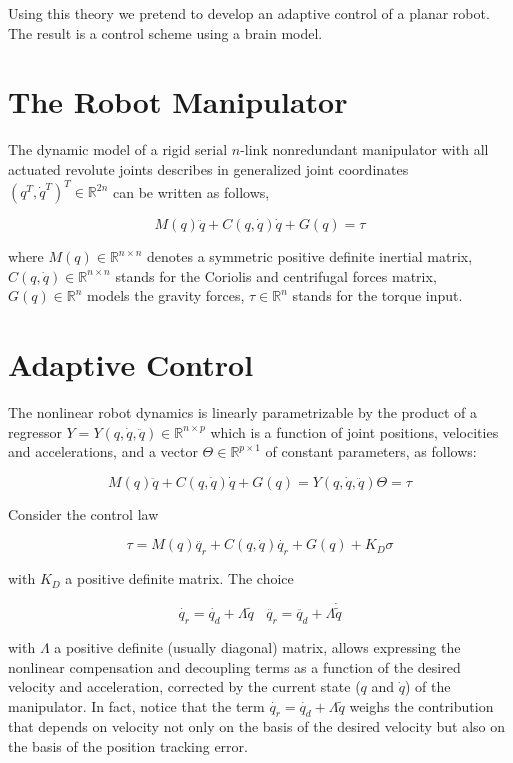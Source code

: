 Using this theory we pretend to develop an adaptive control of a planar robot. The result is a control scheme using a brain model.
\section{The Robot Manipulator}
The dynamic model of a rigid serial $n$-link nonredundant manipulator with all actuated revolute joints describes in generalized joint coordinates $(q^T,\dot{q}^T)^T\in\mathbb{R}^{2n}$ can be written as follows,

\begin{equation}
M(q)\ddot{q}+C(q,\dot{q})\dot{q}+G(q)=\tau\label{din}
\end{equation}

where $M(q)\in\mathbb{R}^{n\times n}$ denotes a symmetric positive definite inertial matrix, $C(q,\dot{q})\in\mathbb{R}^{n\times n}$ stands for the Coriolis and centrifugal forces matrix, $G(q)\in\mathbb{R}^n$ models the gravity forces, $\tau\in\mathbb{R}^n$ stands for the torque input.

\section{Adaptive Control}
The nonlinear robot dynamics is linearly parametrizable \cite{Slotine} by the product of a regressor $Y=Y(q,\dot{q},\ddot{q})\in\mathbb{R}^{n\times p}$ which is a function of joint positions, velocities and accelerations, and a vector $\Theta\in\mathbb{R}^{p\times1}$ of constant parameters, as follows:

\begin{equation}
M(q)\ddot{q}+C(q,\dot{q})\dot{q}+G(q)=Y(q,\dot{q},\ddot{q})\Theta=\tau\label{din2}
\end{equation}

Consider the control law \cite{Adapt}

\begin{equation}
\tau=M(q)\ddot{q_r}+C(q,\dot{q})\dot{q_r}+G(q)+K_D\sigma\label{mal}
\end{equation}

with $K_D$ a positive definite matrix. The choice

\begin{equation}
\dot{q_r}=\dot{q_d}+\Lambda \tilde{q} \ \ \ \ \ddot{q_r}=\ddot{q_d}+\Lambda \dot{\tilde{q}}
\end{equation}

with $\Lambda$ a positive definite (usually diagonal) matrix, allows expressing the nonlinear compensation and decoupling terms as a function of the desired velocity and acceleration, corrected by the current state ($q$ and $\dot{q}$) of the manipulator. In fact, notice that the term $\dot{q_r}=\dot{q_d}+\Lambda \tilde{q}$ weighs the contribution that depends on velocity not only on the basis of the desired velocity but also on the basis of the position tracking error.\\

